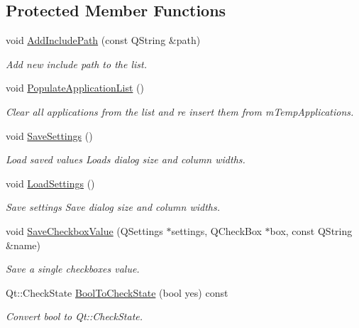 \subsection*{Protected Member Functions}
\begin{DoxyCompactItemize}
\item 
void \hyperlink{class_settings_dialog_a9b965fd9f3f3ae9bea041b8bf1ed7c3b}{Add\-Include\-Path} (const Q\-String \&path)
\begin{DoxyCompactList}\small\item\em Add new include path to the list. \end{DoxyCompactList}\item 
void \hyperlink{class_settings_dialog_a32b2150e9e1197b5f434240fa7743882}{Populate\-Application\-List} ()
\begin{DoxyCompactList}\small\item\em Clear all applications from the list and re insert them from m\-Temp\-Applications. \end{DoxyCompactList}\item 
void \hyperlink{class_settings_dialog_aa639a95d23ecfb472a79a618520b9708}{Save\-Settings} ()
\begin{DoxyCompactList}\small\item\em Load saved values Loads dialog size and column widths. \end{DoxyCompactList}\item 
void \hyperlink{class_settings_dialog_a548da4bbbb32120af8fa9aee8d9c485c}{Load\-Settings} ()
\begin{DoxyCompactList}\small\item\em Save settings Save dialog size and column widths. \end{DoxyCompactList}\item 
void \hyperlink{class_settings_dialog_a7b01f57123cd9beb90371bcab93ed62e}{Save\-Checkbox\-Value} (Q\-Settings $\ast$settings, Q\-Check\-Box $\ast$box, const Q\-String \&name)
\begin{DoxyCompactList}\small\item\em Save a single checkboxes value. \end{DoxyCompactList}\item 
Qt\-::\-Check\-State \hyperlink{class_settings_dialog_a2fff2c846ddfc3641f65222290c53cb2}{Bool\-To\-Check\-State} (bool yes) const 
\begin{DoxyCompactList}\small\item\em Convert bool to Qt\-::\-Check\-State. \end{DoxyCompactList}\item 

\end{DoxyCompactItemize}
